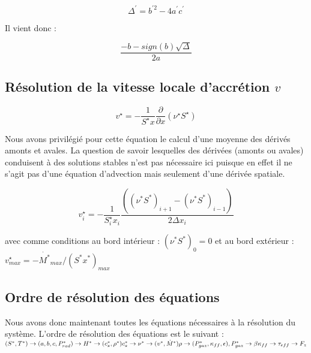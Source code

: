 \begin{equation}
	\Delta^{\prime} = b^{\prime 2} - 4a^{\prime}c^{\prime}
\end{equation} 

Il vient donc : 

\begin{equation}
	\frac{-b -sign(b) \sqrt{\Delta}}{2a}
\end{equation}

\subsection{Résolution de la vitesse locale d'accrétion $v$}
\begin{equation}
    v^\star = - \frac{1}{S^\star x} \frac{\partial}{\partial x} \left(\nu^\star S^\star\right)
\end{equation} 

Nous avons privilégié pour cette équation le calcul d'une moyenne des dérivés amonts et avales. La question de savoir lesquelles des dérivées (amonts ou avales) conduisent à des solutions stables n'est pas nécessaire ici puisque en effet il ne s'agit pas d'une équation d'advection mais seulement d'une dérivée spatiale.  


\begin{equation}
    v^\star_{i} = - \frac{1}{S_{i}^\star x_{i}} \frac{( (\nu^{*}S^{*})_{i+1} - (\nu^{*}S^{*})_{i-1} )}{2 \Delta x_{i}}
\end{equation} 

avec comme conditions au bord intérieur : $(\nu^{*}S^{*})_{0} = 0$ et au bord extérieur : $v^\star_{max}   = - \dot{M^{*}}_{max} / (S^{*}x^{*})_{max}$

\subsection{Ordre de résolution des équations}

Nous avons donc maintenant toutes les équations  nécessaires à la résolution du système. L'ordre de résolution des équations est le suivant :  \\


        \noindent $(S^{*},T^{*}) \rightarrow (a, b, c, P_{rad}^{*}) \rightarrow H^{*}
        \rightarrow (c_{s}^{*}, \rho^{*}) \\
        c_{s}^{*} \rightarrow \nu^{*} \rightarrow (v^{*}, \dot{M}^{*}) \\
        \rho \rightarrow (P_{gaz}^{*}, \kappa_{ff}, \epsilon) , \\
        P_{gaz}^{*} \rightarrow \beta \\
        \kappa_{ff} \rightarrow \tau_{eff} \rightarrow F_{z} $
        

